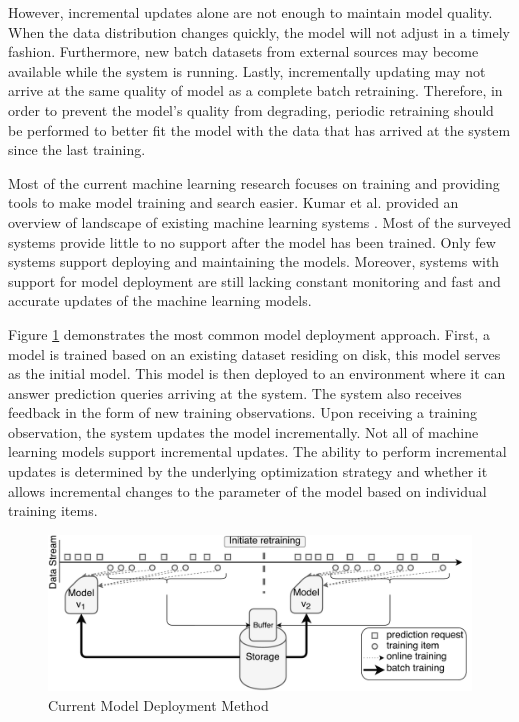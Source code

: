 \documentclass{vldb}
\begin{document}
However, incremental updates alone are not enough to maintain model quality. 
When the data distribution changes quickly, the model will not adjust in a timely fashion. 
Furthermore, new batch datasets from external sources may become available while the system is running.
Lastly, incrementally updating may not arrive at the same quality of model as a complete batch retraining.
Therefore, in order to prevent the model's quality from degrading, periodic retraining should be performed to better fit the model with the data that has arrived at the system since the last training.

Most of the current machine learning research focuses on training and providing tools to make model training and search easier. 
Kumar et al. provided an overview of landscape of existing machine learning systems \cite{kumar2015survey}. 
Most of the surveyed systems provide little to no support after the model has been trained.
Only few systems \cite{akdere2011case, crankshaw2014missing} support deploying and maintaining the models.
Moreover, systems with support for model deployment are still lacking constant monitoring and fast and accurate updates of the machine learning models.

Figure \ref{fig:velox-work-flow} demonstrates the most common model deployment approach.
First, a model is trained based on an existing dataset residing on disk, this model serves as the initial model.
This model is then deployed to an environment where it can answer prediction queries arriving at the system.
The system also receives feedback in the form of new training observations.
Upon receiving a training observation, the system updates the model incrementally.
Not all of machine learning models support incremental updates.
The ability to perform incremental updates is determined by the underlying optimization strategy and whether it allows incremental changes to the parameter of the model based on individual training items.
\begin{figure}[t]
\centering
\includegraphics[width=1\columnwidth]{../images/velox-final.pdf}
\caption{Current Model Deployment Method}
\label{fig:velox-work-flow}
\end{figure}
\end{document}
